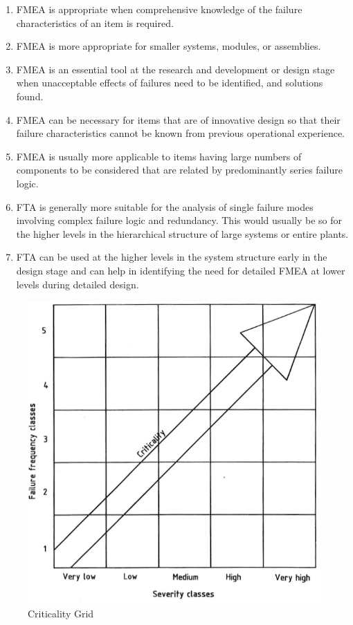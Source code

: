 \documentclass[./dissertation.tex]{subfiles}
\begin{document}
\begin{enumerate}
\item FMEA is appropriate when comprehensive knowledge of the failure characteristics of an item is required.
\item FMEA is more appropriate for smaller systems, modules, or assemblies.
\item FMEA is an essential tool at the research and development or design stage when unacceptable effects of failures need to be identified, and solutions found.
\item FMEA can be necessary for items that are of innovative design so that their failure characteristics cannot be known from previous operational experience.
\item FMEA is usually more applicable to items having large numbers of components to be considered that are related by predominantly series failure logic.
\item FTA is generally more suitable for the analysis of single failure modes involving complex failure logic and redundancy. This would usually be so for the higher levels in the hierarchical structure of large systems or entire plants.
\item FTA can be used at the higher levels in the system structure early in the design stage and can help in identifying the need for detailed FMEA at lower levels during detailed design.
\end{enumerate}










\begin{figure}
        \includegraphics[width=\linewidth]{subfiles/imgs/fmea_criticality_grid.png}
  \caption{Criticality Grid}
        \label{fig:criticality_grid}
\end{figure}
\end{document}
